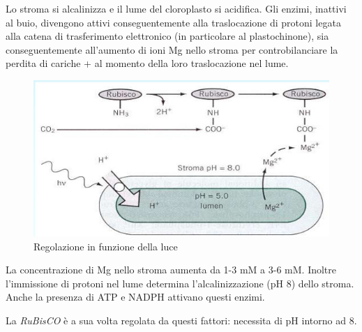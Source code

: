 \documentclass[a4paper,12pt]{book}
\begin{document}
Lo stroma si alcalinizza e il lume del cloroplasto si acidifica. Gli enzimi, inattivi al buio, divengono attivi conseguentemente alla traslocazione di protoni legata alla catena di trasferimento elettronico (in particolare al plastochinone), sia conseguentemente all'aumento di ioni Mg nello stroma per controbilanciare la perdita di cariche + al momento della loro traslocazione nel lume.
\begin{figure}[H]
\centering
\includegraphics[scale=0.4]{immagini/reg1.jpg}
\caption{Regolazione in funzione della luce}
\end{figure}
La concentrazione di Mg nello stroma aumenta
da 1-3 mM a 3-6 mM. Inoltre l’immissione di protoni nel lume determina l’alcalinizzazione (pH 8) dello
stroma.
Anche la presenza di ATP e NADPH attivano questi enzimi.

La \emph{RuBisCO} è a sua volta regolata da questi fattori: necessita di pH intorno ad 8.
\end{document}
